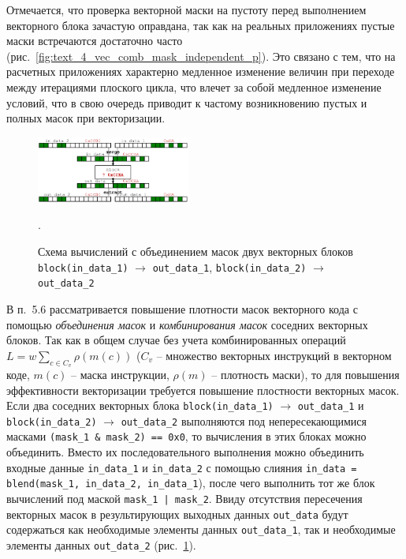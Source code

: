 \documentclass[a4paper,14pt]{extarticle}                     %
\theoremstyle{plain}                                         %
\begin{document}
Отмечается, что проверка векторной маски на пустоту перед выполнением векторного блока зачастую оправдана, так как на реальных приложениях пустые маски встречаются достаточно часто (рис.~\ref{fig:text_4_vec_comb_mask_independent_p}).
Это связано с тем, что на расчетных приложениях характерно медленное изменение величин при переходе между итерациями плоского цикла, что влечет за собой медленное изменение условий, что в свою очередь приводит к частому возникновению пустых и полных масок при векторизации.


\begin{figure}[ht]
\centering
\includegraphics[width=0.45\textwidth]{./fig/vec_unite_masks.pdf}
\singlespacing
\caption{Схема вычислений с объединением масок двух векторных блоков \texttt{block(in\_data\_1)} $\rightarrow$ \texttt{out\_data\_1}, \texttt{block(in\_data\_2)} $\rightarrow$ \texttt{out\_data\_2}}.
\label{fig:vec_unite_masks}
\end{figure}

В п.~5.6 рассматривается повышение плотности масок векторного кода с помощью \textit{объединения масок} и \textit{комбинирования масок} соседних векторных блоков.
Так как в общем случае без учета комбинированных операций $L = w \sum_{c \in C_v}{\rho(m(c))}$ ($C_v$ -- множество векторных инструкций в векторном коде, $m(c)$ -- маска инструкции, $\rho(m)$ -- плотность маски), то для повышения эффективности векторизации требуется повышение плостности векторных масок.
Если два соседних векторных блока \texttt{block(in\_data\_1)} $\rightarrow$ \texttt{out\_data\_1} и \texttt{block(in\_data\_2)} $\rightarrow$ \texttt{out\_data\_2} выполняются под непересекающимися масками \texttt{(mask\_1 \& mask\_2) == 0x0}, то вычисления в этих блоках можно объединить.
Вместо их последовательного выполнения можно объединить входные данные \texttt{in\_data\_1} и \texttt{in\_data\_2} с помощью слияния \texttt{in\_data = blend(mask\_1, in\_data\_2, in\_data\_1}), после чего выполнить тот же блок вычислений под маской \texttt{mask\_1 | mask\_2}.
Ввиду отсутствия пересечения векторных масок в результирующих выходных данных \texttt{out\_data} будут содержаться как необходимые элементы данных \texttt{out\_data\_1}, так и необходимые элементы данных \texttt{out\_data\_2} (рис.~\ref{fig:vec_unite_masks}).
\end{document}
